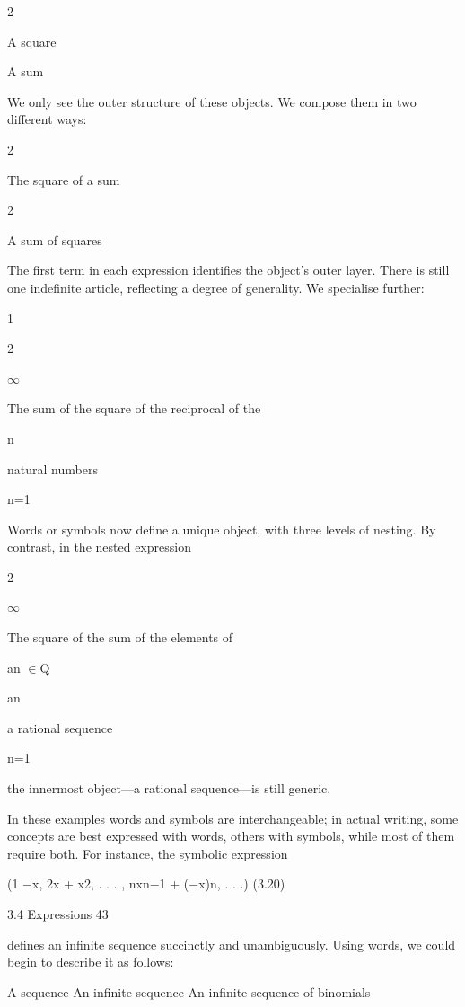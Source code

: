 \documentclass[11pt]{article}
\theoremstyle{plain}
\theoremstyle{definition}
\begin{document}
2

\textperiodcentered{} \textperiodcentered{} \textperiodcentered{} A square

\textperiodcentered{} \textperiodcentered{} \textperiodcentered{} A sum

We only see the outer structure of these objects. We compose them in two different ways:

2

\textperiodcentered{} \textperiodcentered{} \textperiodcentered{}

The square of a sum

2

\textperiodcentered{} \textperiodcentered{} \textperiodcentered{} A sum of squares

The first term in each expression identifies the object's outer layer. There is still one indefinite article, reflecting a degree of generality. We specialise further:

1

2

$\infty$

The sum of the square of the reciprocal of the

n

natural numbers

n=1

Words or symbols now define a unique object, with three levels of nesting. By contrast, in the nested expression

2

$\infty$

The square of the sum of the elements of

an $\in$Q

an

a rational sequence

n=1

the innermost object---a rational sequence---is still generic.

In these examples words and symbols are interchangeable; in actual writing, some concepts are best expressed with words, others with symbols, while most of them require both. For instance, the symbolic expression

(1 $-$x, 2x + x2, . . . , nxn$-$1 + ($-$x)n, . . .) (3.20)

3.4 Expressions 43

defines an infinite sequence succinctly and unambiguously. Using words, we could begin to describe it as follows:

A sequence An infinite sequence An infinite sequence of binomials
\end{document}

